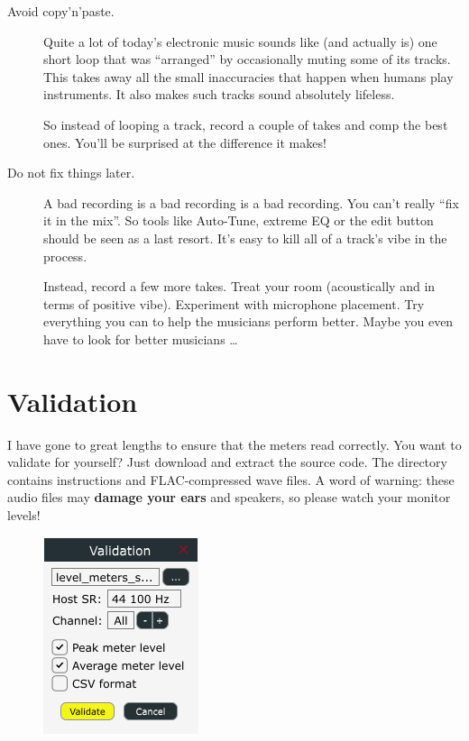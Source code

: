\begin{description}
\item[Avoid copy'n'paste.]  Quite a lot of today's electronic music
  sounds like (and actually is) one short loop that was ``arranged''
  by occasionally muting some of its tracks.  This takes away all the
  small inaccuracies that happen when humans play instruments.  It
  also makes such tracks sound absolutely lifeless.

  So instead of looping a track, record a couple of takes and comp the
  best ones.  You'll be surprised at the difference it makes!

\item[Do not fix things later.]  A bad recording is a bad recording is
  a bad recording.  You can't really ``fix it in the mix''.  So tools
  like Auto-Tune, extreme EQ or the edit button should be seen as a
  last resort.  It's easy to kill all of a track's vibe in the
  process.

  Instead, record a few more takes.  Treat your room (acoustically and
  in terms of positive vibe).  Experiment with microphone placement.
  Try everything you can to help the musicians perform better.  Maybe
  you even have to look for better musicians \dots

\end{description}

\chapter{Validation}
\label{chap:validation}

I have gone to great lengths to ensure that the meters read correctly.
You want to validate for yourself?  Just download and extract the
source code.  The directory  contains instructions
and FLAC-compressed wave files.  A word of warning: these audio files
may \textbf{damage your ears} and speakers, so please watch your
monitor levels!

\begin{figure}
  \includegraphics[scale=0.65,clip]{include/images/dialog_validation.png}
\end{figure}

